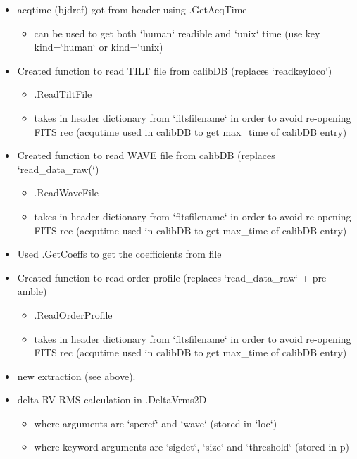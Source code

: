 \begin{itemize}
\item acqtime (bjdref) got from header using \spirouImage.GetAcqTime
	\begin{itemize}
	\item can be used to get both `human` readible and `unix` time (use key kind=`human` or kind=`unix)
	\end{itemize}

\item Created function to read TILT file from calibDB (replaces `readkeyloco`)
	\begin{itemize}
	\item \spirouImage.ReadTiltFile
	\item takes in header dictionary from `fitsfilename` in order to avoid re-opening FITS rec (acqutime used in calibDB to get max\_time of calibDB entry) 
	\end{itemize}

\item Created function to read WAVE file from calibDB (replaces `read\_data\_raw(`)
	\begin{itemize}
	\item \spirouImage.ReadWaveFile
	\item takes in header dictionary from `fitsfilename` in order to avoid re-opening FITS rec (acqutime used in calibDB to get max\_time of calibDB entry) 
	\end{itemize}

\item Used \spirouLOCOR.GetCoeffs to get the coefficients from file

\item Created function to read order profile (replaces `read\_data\_raw` + pre-amble)
	\begin{itemize}
	\item \spirouImage.ReadOrderProfile
	\item takes in header dictionary from `fitsfilename` in order to avoid re-opening FITS rec (acqutime used in calibDB to get max\_time of calibDB entry) 
	\end{itemize}

\item new extraction (see \calextractRAW above).

\item delta RV RMS calculation in \spirouRV.DeltaVrms2D
	\begin{itemize}
	\item where arguments are `speref` and `wave` (stored in `loc`)
	\item where keyword arguments are `sigdet`, `size` and `threshold` (stored in p)
	\end{itemize}


\end{itemize}
